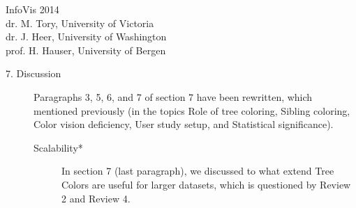 \documentclass{letter}
\begin{document}
\begin{letter}{InfoVis 2014 \\ dr. M. Tory, University of Victoria \\ dr. J. Heer, University of Washington \\ prof. H. Hauser, University of Bergen}
\begin{description}
\begin{description}
\end{description}
\item[7. Discussion] Paragraphs 3, 5, 6, and 7 of section 7 have been rewritten, which mentioned previously (in the topics Role of tree coloring, Sibling coloring, Color vision deficiency, User study setup, and Statistical significance).
\begin{description}
\item[Scalability*] In section 7 (last paragraph), we discussed to what extend Tree Colors are useful for larger datasets, which is questioned by Review 2 and Review 4.
\end{description}
\end{description}










\end{letter}
\end{document}
